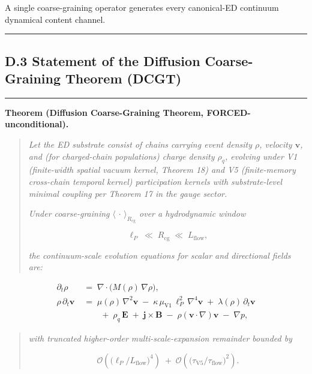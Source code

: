 \documentclass[
]{article}
\begin{document}
A single coarse-graining operator generates every canonical-ED continuum
dynamical content channel.

\begin{center}\rule{0.5\linewidth}{0.5pt}\end{center}

\subsection{D.3 Statement of the Diffusion Coarse-Graining Theorem
(DCGT)}\label{d.3-statement-of-the-diffusion-coarse-graining-theorem-dcgt}

\begin{center}\rule{0.5\linewidth}{0.5pt}\end{center}

\textbf{Theorem (Diffusion Coarse-Graining Theorem,
FORCED-unconditional).}

\begin{quote}
\emph{Let the ED substrate consist of chains carrying event density
\(\rho\), velocity \(\mathbf{v}\), and (for charged-chain populations)
charge density \(\rho_q\), evolving under V1 (finite-width spatial
vacuum kernel, Theorem 18) and V5 (finite-memory cross-chain temporal
kernel) participation kernels with substrate-level minimal coupling per
Theorem 17 in the gauge sector.}

\emph{Under coarse-graining \(\langle\,\cdot\,\rangle_{R_\mathrm{cg}}\)
over a hydrodynamic window}

\[\ell_P \;\ll\; R_\mathrm{cg} \;\ll\; L_\mathrm{flow},\]

\emph{the continuum-scale evolution equations for scalar and directional
fields are:}
\end{quote}

\[\boxed{\;\begin{aligned}
\partial_t\rho \;&=\; \nabla\cdot\bigl(M(\rho)\,\nabla\rho\bigr), \\[4pt]
\rho\,\partial_t\mathbf{v} \;&=\; \mu(\rho)\,\nabla^2\mathbf{v} \;-\; \kappa\,\mu_\mathrm{V1}\,\ell_P^2\,\nabla^4\mathbf{v} \;+\; \lambda(\rho)\,\partial_t\mathbf{v} \\[2pt]
&\qquad +\; \rho_q\,\mathbf{E} \;+\; \mathbf{j}\times\mathbf{B} \;-\; \rho(\mathbf{v}\cdot\nabla)\mathbf{v} \;-\; \nabla p,
\end{aligned}\;}\]

\begin{quote}
\emph{with truncated higher-order multi-scale-expansion remainder
bounded by}

\[\mathcal{O}\!\left(\bigl(\ell_P/L_\mathrm{flow}\bigr)^4\right) \;+\; \mathcal{O}\!\left(\bigl(\tau_\mathrm{V5}/\tau_\mathrm{flow}\bigr)^2\right).\]
\end{quote}
\end{document}

